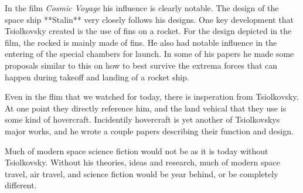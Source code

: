 \documentclass[10pt]{armath}
\begin{document}
In the film \textit{Cosmic Voyage} his influence is clearly notable. The design
of the space ship **Stalin** very closely follows his designs. One key
development that Tsiolkovsky created is the use of fins on a rocket. For the
design depicted in the film, the rocked is mainly made of fins. He also had
notable influence in the entering of the special chambers for launch. In some
of his papers he made some proposals similar to this on how to best survive
the extrema forces that can happen during takeoff and landing of a rocket ship.

Even in the flim that we watched for today, there is insperation from
Tsiolkovsky. At one point they directly reference him, and the land vehical
that they use is some kind of hovercraft. Incidentily hovercraft is yet another
of Tsiolkovskys major works, and he wrote a couple papers describing their
function and design.

Much of modern space science fiction would not be as it is today without
Tsiolkovsky. Without his theories, ideas and research, much of modern space
travel, air travel, and science fiction would be year behind, or be completely
different.

\nocite{*}
\printbibliography{}
\end{document}
